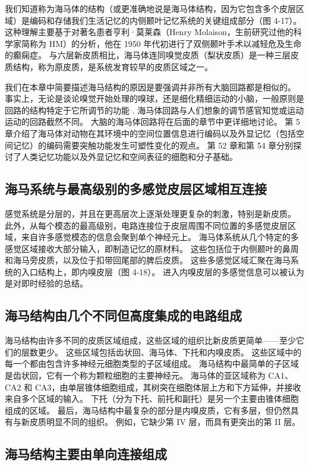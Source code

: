 我们知道称为海马体的结构（或更准确地说是海马体结构，因为它包含多个皮层区域）是编码和存储我们生活记忆的内侧颞叶记忆系统的关键组成部分（图 4-17）。 这种理解主要基于对著名患者亨利·莫莱森（Henry Molaison，生前研究过他的科学家简称为 HM）的分析，他在 1950 年代初进行了双侧颞叶手术以减轻危及生命的癫痫症。 与六层新皮质相比，海马体连同嗅觉皮质（梨状皮质）是一种三层皮质结构，称为原皮质，是系统发育较早的皮质区域之一。

我们在本章中简要描述海马结构的原因是要强调并非所有大脑回路都是相似的。 事实上，无论是谈论嗅觉开始处理的嗅球，还是细化精细运动的小脑，一般原则是回路的结构特定于它所调节的功能 . 海马体回路与人们想象的调节感官知觉或运动运动的回路截然不同。 大脑的海马体回路将在后面的章节中更详细地讨论。 第 5 章介绍了海马体对动物在其环境中的空间位置信息进行编码以及外显记忆（包括空间记忆）的编码需要突触功能发生可塑性变化的观点。 第 52 章和第 54 章分别探讨了人类记忆功能以及外显记忆和空间表征的细胞和分子基础。

\subsection{海马系统与最高级别的多感觉皮层区域相互连接}

感觉系统是分层的，并且在更高层次上逐渐处理更复杂的刺激，特别是新皮质。 此外，从每个模态的最高级别，电路连接位于皮层周围不同位置的多感觉皮层区域，来自许多感觉模态的信息会聚到单个神经元上。 海马体系统从几个特定的多感觉区域接收大部分输入，即制造记忆的原材料。 这些包括位于内侧颞叶的鼻周和海马旁皮质，以及位于扣带回尾部的脾后皮质。 这些多感觉区域汇聚在海马系统的入口结构上，即内嗅皮层（图 4-18）。 进入内嗅皮层的多感觉信息可以被认为是对即时经验的总结。

\subsection{海马结构由几个不同但高度集成的电路组成}
海马结构由许多不同的皮质区域组成，这些区域的组织比新皮质更简单——至少它们的层数更少。 这些区域包括齿状回、海马体、下托和内嗅皮质。 这些区域中的每一个都由包含许多神经元细胞类型的子区域组成。 海马结构中最简单的子区域是齿状回，它有一个称为颗粒细胞的主要神经元。 海马体的亚区域称为 CA1、CA2 和 CA3，由单层锥体细胞组成，其树突在细胞体层上方和下方延伸，并接收来自多个区域的输入。 下托（分为下托、前托和副托）是另一个主要由锥体细胞组成的区域。 最后，海马结构中最复杂的部分是内嗅皮质，它有多层，但仍然具有与新皮质明显不同的组织。 例如，它缺少第 IV 层，而具有更突出的第 II 层。

\subsection{海马结构主要由单向连接组成}

